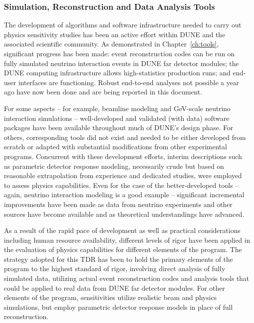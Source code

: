 \subsubsection{Simulation, Reconstruction and Data Analysis Tools}
\label{sec:exec-assm-meth-simreco}

The development of algorithms and software infrastructure needed
to carry out physics sensitivity studies has been an active 
effort within DUNE and the associated scientific community.  
As demonstrated in Chapter~\ref{ch:tools}, significant progress 
has been made: event reconstruction 
codes can be run on fully simulated neutrino interaction events 
in DUNE far detector modules; the DUNE computing infrastructure 
allows high-statistics production runs; and end-user interfaces 
are functioning.  Robust end-to-end analyses not 
possible a year ago have now been done and are being 
reported in this document.

For some aspects -- for example, beamline modeling
and GeV-scale neutrino interaction simulations --
well-developed and validated (with data) software packages have
been available throughout much of DUNE's design phase.
For others, corresponding tools did not exist and needed to be
either developed from scratch or adapted with substantial
modifications from other experimental programs.  Concurrent
with these development efforts, interim descriptions such
as parametric detector response modeling, necessarily crude
but based on reasonable extrapolation from experience and
dedicated studies, were employed to assess physics capabilities.
Even for the case of the better-developed tools -- again, neutrino 
interaction modeling is a good example -- significant incremental
improvements have been made as data from neutrino experiments
and other sources have become available and as theoretical
understandings have advanced.

As a result of the rapid pace of development as well as 
practical considerations including human 
resource availability, different levels
of rigor have been applied in the evaluation of physics capabilities for different elements of the program.  
The strategy adopted for
this TDR has been to hold the primary elements of the program
to the highest standard of rigor, involving direct analysis
of fully simulated data, utilizing actual event reconstruction
codes and analysis tools that could be applied to real data
from DUNE far detector modules.  For other elements of the
program, sensitivities utilize realistic beam and
physics simulations, but employ parametric detector
response models in place of full reconstruction.

